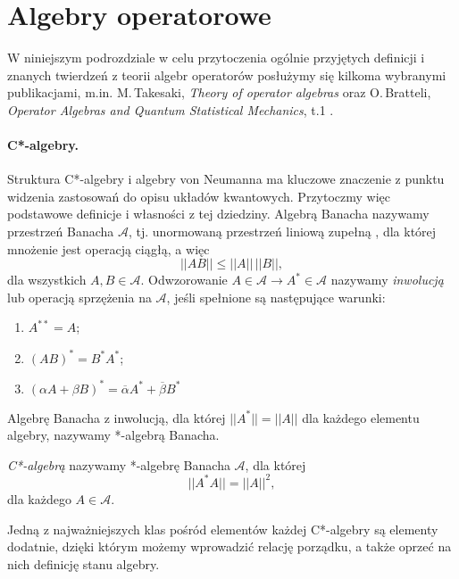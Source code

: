 \section{Algebry operatorowe}
W niniejszym podrozdziale w celu przytoczenia ogólnie przyjętych definicji
i znanych twierdzeń z teorii algebr operatorów posłużymy się kilkoma wybranymi
publikacjami, m.in.
M.\,Takesaki, \emph{Theory of operator algebras} \cite{Takesaki1} oraz
O.\,Bratteli, \emph{Operator Algebras and Quantum Statistical Mechanics}, t.1
\cite{Bratteli2003}.

\paragraph{C*-algebry.}
Struktura C*-algebry i algebry von Neumanna ma kluczowe znaczenie z punktu widzenia
zastosowań do opisu układów kwantowych.
Przytoczmy więc podstawowe definicje i własności z tej dziedziny.
Algebrą Banacha nazywamy przestrzeń Banacha $\mathcal{A}$,
tj. unormowaną przestrzeń
liniową zupełną \cite{Rudin1991}, dla której mnożenie jest
operacją ciągłą, a więc
\begin{equation}
 \label{eq:algBanachMultiplication}
|| A B || \leq ||A|| \, ||B||,
\end{equation}
dla wszystkich $A, B \in \mathcal{A}$.
Odwzorowanie $A \in \mathcal{A} \rightarrow A^{*} \in \mathcal{A}$ nazywamy
\emph{inwolucją}  lub
operacją sprzężenia na $\mathcal{A}$, jeśli spełnione są następujące warunki:
\begin{enumerate}
 \item $A^{**} = A$;
 \item $(AB)^{*} = B^{*} A^{*}$;
 \item $(\alpha A + \beta B)^{*} = %
  \overline{\alpha} A^{*} + \overline{\beta} B^{*}$
\end{enumerate}
Algebrę Banacha z inwolucją, dla której
$||A^{*}|| = ||A||$ dla każdego elementu
algebry, nazywamy *-algebrą Banacha.


\begin{Definition}
 \label{def:c*alg}
  \emph{C*-algebrą} nazywamy *-algebrę Banacha $\mathcal{A}$, dla której
\begin{equation}
 || A^{*} A || = ||A||^{2},
\end{equation}
dla każdego $A \in \mathcal{A}$.
\end{Definition}

Jedną z najważniejszych klas pośród elementów każdej C*-algebry są
elementy dodatnie, dzięki którym możemy wprowadzić relację
porządku, a także oprzeć na nich definicję stanu algebry.


